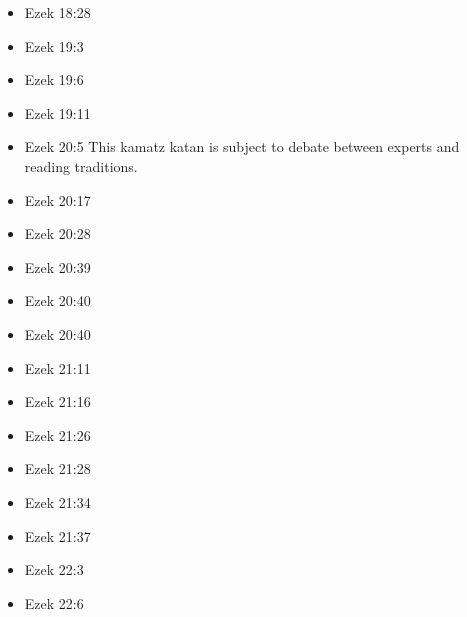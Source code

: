 \documentclass[14pt]{article}
\begin{document}
\begin{multicols}{2}
\begin{itemize}
										\item Ezek 18:28
										
										\item Ezek 19:3
										
										\item Ezek 19:6
										
										\item Ezek 19:11
										
										\item Ezek 20:5 This kamatz katan is subject to debate between experts and reading traditions.
										
										\item Ezek 20:17
										
										\item Ezek 20:28
										
										\item Ezek 20:39
										
										\item Ezek 20:40
										
										\item Ezek 20:40
										
										\item Ezek 21:11
										
										\item Ezek 21:16
										
										\item Ezek 21:26
										
										\item Ezek 21:28
												
												\item Ezek 21:34
												
												\item Ezek 21:37
												
												\item Ezek 22:3
												
												\item Ezek 22:6
												

\end{itemize}
\end{multicols}
\end{document}
